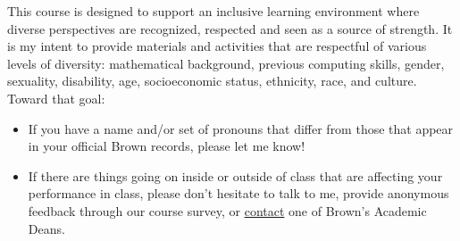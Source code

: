 This course is designed to support an inclusive learning environment where diverse perspectives are recognized, respected and seen as a source of strength. It is my intent to provide materials and activities that are respectful of various levels of diversity: mathematical background, previous computing skills, gender, sexuality, disability, age, socioeconomic status, ethnicity, race, and culture. Toward that goal:

\begin{itemize}
\item If you have a name and/or set of pronouns that differ from those that appear in your official Brown records, please let me know!
\item If there are things going on inside or outside of class that are affecting your performance in class, please don't hesitate to talk to me, provide anonymous feedback through our course survey, or \href{https://www.brown.edu/academics/college/speak-academic-dean}{contact} one of Brown's Academic Deans.
\end{itemize}
